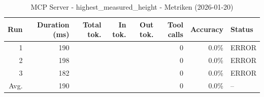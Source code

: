 \begin{table}[ht]
\centering
\small
\caption{MCP Server - highest\_measured\_height - Metriken (2026-01-20)}
\label{tab:mcp\_highest\_measured\_height\_metrics\_2026-01-20}
\begin{tabular}{r r r r r r r l}
\hline
Run & Duration (ms) & Total tok. & In tok. & Out tok. & Tool calls & Accuracy & Status \\
\hline
1 & 190 &  &  &  & 0 & 0.0\% & ERROR \\
2 & 198 &  &  &  & 0 & 0.0\% & ERROR \\
3 & 182 &  &  &  & 0 & 0.0\% & ERROR \\
\hline
Avg. & 190 &  &  &  & 0 & 0.0\% & -- \\
\hline
\end{tabular}
\end{table}
